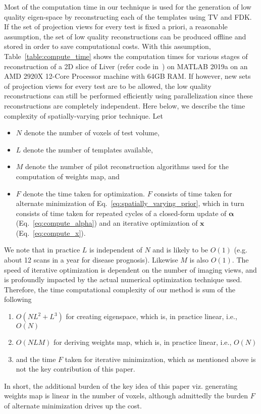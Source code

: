 \documentclass[journal]{IEEEtran}
\begin{document}
Most of the computation time in our technique is used for the
generation of low quality eigen-space by reconstructing each of the
templates using TV and FDK. If the set of projection views for every
test is fixed a priori, a reasonable assumption,
the set of low quality reconstructions can be
produced offline and stored in order to save computational costs. With
this assumption, Table~\ref{table:compute_time} shows the computation
times for various stages of reconstruction of a 2D slice of Liver
(refer code in~\cite{codeRepo}) on MATLAB 2019a on an AMD 2920X
12-Core Processor machine with 64GB RAM. If however, new sets of
projection views for every test are to be allowed, the low quality
reconstructions can still be performed efficiently using
parallelization since these reconstructions are completely
independent. Here below, we describe the time complexity of
spatially-varying prior technique.  Let
\begin{itemize}
\item $N$ denote the number of voxels of test volume,
\item $L$ denote the number of templates available,
\item $M$ denote the number of pilot reconstruction algorithms used for the computation of weights map, and
\item $F$ denote the time taken for optimization.
  $F$ consists of time taken for alternate minimization of Eq.~\ref{eq:spatially_varying_prior}, which in turn consists of time taken for repeated cycles of a closed-form update of $\boldsymbol{\alpha}$ (Eq.~\ref{eq:compute_alpha}) and an iterative optimization of  $\boldsymbol{x}$ (Eq.~\ref{eq:compute_x}). 
\end{itemize}
We note that in practice $L$ is independent of $N$ and is likely to be $O(1)$  (e.g. about 12 scans in a year for disease prognosis).  Likewise $M$ is also $O(1)$. The speed of iterative optimization is dependent on the number of imaging views, and is profoundly impacted by the actual numerical optimization technique used.  
Therefore, the time computational complexity of our method is sum of
the following
\begin{enumerate}
\item $O(NL^2+L^3)$ for creating eigenspace, which is, in practice linear, i.e., $O(N)$
\item $O(NLM)$ for deriving weights map, which is, in practice linear, i.e., $O(N)$
\item and the time $F$  taken for iterative minimization, which as mentioned above is not the key contribution of this paper. 
\end{enumerate}
In short, the additional burden of the key idea of this paper viz. generating weights map is linear in the number of voxels, although admittedly the burden $F$ of alternate minimization drives up the cost.
\end{document}
